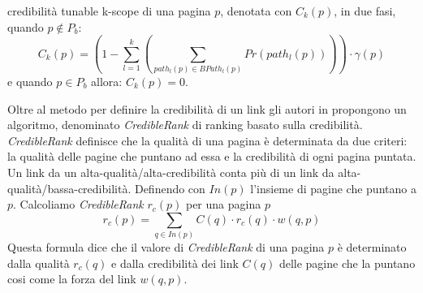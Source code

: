 credibilità tunable k-scope di una pagina \(p\), denotata con \(C_k(p)\), in due fasi, quando \(p \not \in P_b\):
\begin{equation} 
C_k(p)=\left ( 1 -\sum_{l=1}^k \left ( \sum_{path_l(p)\in BPath_l(p)} Pr(path_l(p)) \right ) \right ) \cdot\gamma(p)
\end{equation}
e quando \(p\in P_b\) allora: \(C_k(p)=0\).

Oltre al metodo per definire la credibilità di un link gli autori in \cite{Caverlee:2007:CWS:1281100.1281124} propongono un algoritmo, denominato \textit{CredibleRank} di ranking basato sulla credibilità. \textit{CredibleRank} definisce che la qualità di una pagina è determinata da due criteri: la qualità delle pagine che puntano ad essa e la credibilità di ogni pagina puntata. Un link da un alta-qualità/alta-credibilità conta più di un link da alta-qualità/bassa-credibilità. Definendo con \(In(p)\) l'insieme di pagine che puntano a \(p\). Calcoliamo \textit{CredibleRank} \(r_c(p)\) per una pagina \(p\)
\begin{equation}
r_c(p)=\sum_{q\in In(p)}C(q)\cdot r_c(q)\cdot w(q,p)
\end{equation}
Questa formula dice che il valore di \textit{CredibleRank} di una pagina \(p\) è determinato dalla qualità \(r_c(q)\) e dalla credibilità dei link \(C(q)\) delle pagine che la puntano cosi come la forza del link \(w(q,p)\).

